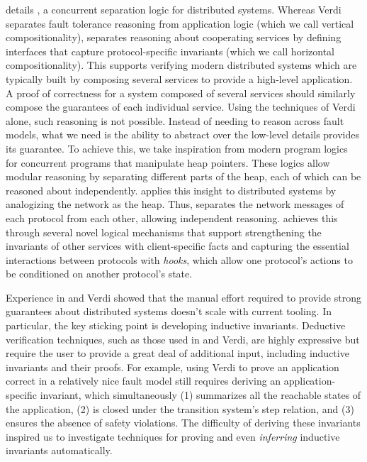 details \disel, a concurrent separation logic for distributed
systems.  Whereas Verdi separates fault tolerance reasoning from
application logic (which we call vertical compositionality), \disel
separates reasoning about cooperating services by defining interfaces
that capture protocol-specific invariants (which we call horizontal
compositionality).  This supports verifying modern distributed systems
which are typically built by composing several services to provide a
high-level application.  A proof of correctness for a system composed
of several services should similarly compose the guarantees of each
individual service. Using the techniques of Verdi alone, such reasoning
is not possible. Instead of needing to reason across fault models,
what we need is the ability to abstract over the low-level details
provides its guarantee. To achieve this, we take inspiration from
modern program logics for concurrent programs that manipulate
heap pointers. These logics allow modular reasoning by separating
different parts of the heap, each of which can be reasoned about
independently. \disel applies this insight to distributed systems
by analogizing the network as the heap. Thus, \disel separates
the network messages of each protocol from each other, allowing
independent reasoning. \disel achieves this through several
novel logical mechanisms that support strengthening the invariants
of other services with client-specific facts and capturing the
essential interactions between protocols with \emph{hooks}, which
allow one protocol's actions to be conditioned on another protocol's
state.

Experience in \disel and Verdi showed that the manual effort required
to provide strong guarantees about distributed systems doesn't scale
with current tooling.  In particular, the key sticking point is
developing inductive invariants.  Deductive verification techniques,
such as those used in \disel and Verdi, are highly expressive but
require the user to provide a great deal of additional input,
including inductive invariants and their proofs. For example, using
Verdi to prove an application correct in a relatively nice fault model
still requires deriving an application-specific invariant, which
simultaneously (1) summarizes all the reachable states of the
application, (2) is closed under the transition system's step
relation, and (3) ensures the absence of safety violations.
The difficulty of deriving these invariants inspired us to
investigate techniques for proving and even \emph{inferring}
inductive invariants automatically.

